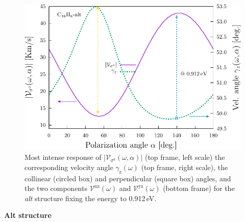 \documentclass[prb,11pt,tightenlines,twocolumn,aps]{revtex4-1}
\begin{document}
\begin{figure}[t]
    \centering
    \includegraphics[width=\linewidth]{altplots/alt-vaz-rag}
    \caption{Most intense response of
    $|\mathcal{V}_{\sigma^{\mathrm{z}}}(\omega,\alpha)|$ (top frame, left scale)
    the corresponding velocity angle $\gamma_{\mathrm{z}}(\omega)$ (top frame,
    right scale), the collinear (circled box) and perpendicular (square box)
    angles, and the two components $\mathcal{V}^{\mathrm{xz}}(\omega)$ and
    $\mathcal{V}^{\mathrm{yz}}(\omega)$ (bottom frame) for the \emph{alt}
    structure fixing the energy to 0.912\,eV.}
    \label{fig:alt-vaz-rag}
\end{figure}


\textbf{Alt structure}
\end{document}
